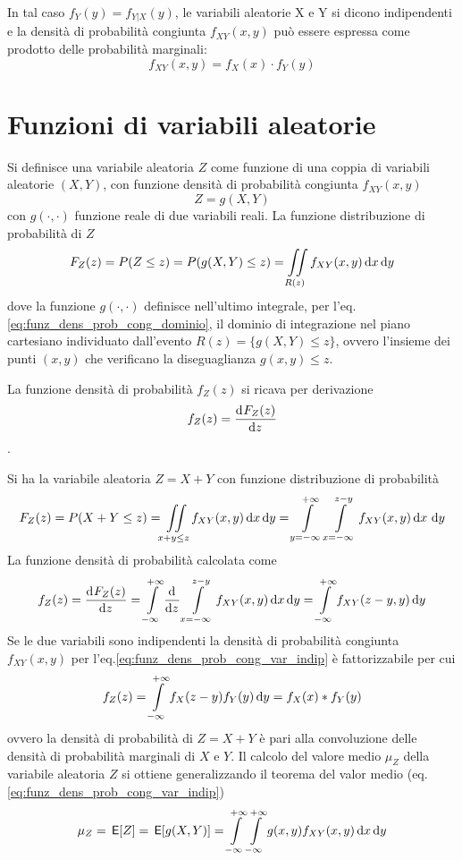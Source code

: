 In tal caso $f_Y(y)=f_{Y|X}(y)$, le variabili aleatorie X e Y si dicono indipendenti e la densità di probabilità congiunta $f_{XY}(x,y)$ può essere espressa come prodotto delle probabilità marginali:
\begin{equation}
\label{eq:funz_dens_prob_cong_var_indip}
	f_{XY}(x,y)=f_X(x)\cdot f_Y(y)
\end{equation}

\clearpage
\section{Funzioni di variabili aleatorie}
Si definisce una variabile aleatoria $Z$ come funzione di una coppia di variabili aleatorie $(X,Y)$, con funzione densità di probabilità congiunta $f_{XY}(x,y)$
\[
	Z=g(X,Y)
\]
con $g(\cdot,\cdot)$ funzione reale di due variabili reali. La funzione distribuzione di probabilità di $Z$
\[
	F_Z(z)=P(Z\leq z)=P(g(X,Y)\leq z)=\iint\limits_{R(z)}{f_{XY}(x,y)\mathop{}\!\mathrm{d} x \mathop{}\!\mathrm{d} y}
\]
dove la funzione $g(\cdot,\cdot)$ definisce nell'ultimo integrale, per l'eq.\ref{eq:funz_dens_prob_cong_dominio}, il dominio di integrazione nel piano cartesiano individuato dall'evento $R(z)=\{g(X,Y)\leq z\}$, ovvero l'insieme dei punti $(x,y)$ che verificano la diseguaglianza $g(x,y)\leq z$.

La funzione densità di probabilità $f_Z(z)$ si ricava per derivazione
\[
	f_Z(z)=\dfrac{\mathop{}\!\mathrm{d}^{}F_Z(z)}{\mathop{}\!\mathrm{d} z^{}}
\].

\begin{esempio}
Si ha la variabile aleatoria $Z=X+Y$ con funzione distribuzione di probabilità
\[
	F_Z(z)=P(X+Y\leq z)=\iint\limits_{x+y\leq z}{f_{XY}(x,y)\mathop{}\!\mathrm{d} x \mathop{}\!\mathrm{d} y}=\int\limits_{y=-\infty}^{+\infty}\int\limits_{x=-\infty}^{z-y}{f_{XY}(x,y)}{\,\mathop{}\!\mathrm{d} x\,\mathop{}\!\mathrm{d} y}
\]
La funzione densità di probabilità calcolata come \[
	f_Z(z)=\dfrac{\mathop{}\!\mathrm{d}^{}F_Z(z)}{\mathop{}\!\mathrm{d} z^{}}=\int\limits_{-\infty}^{+\infty}{\dfrac{\mathop{}\!\mathrm{d}^{}}{\mathop{}\!\mathrm{d} z^{}}\int\limits_{x=-\infty}^{z-y}{f_{XY}(x,y)}{\,\mathop{}\!\mathrm{d}{x}}}{\,\mathop{}\!\mathrm{d}{y}}=\int\limits_{-\infty}^{+\infty}{f_{XY}(z-y,y)}{\,\mathop{}\!\mathrm{d}{y}}
\]
Se le due variabili sono indipendenti la densità di probabilità congiunta $f_{XY}(x,y)$ per l'eq.\ref{eq:funz_dens_prob_cong_var_indip} è fattorizzabile per cui
\[
	f_Z(z)=\int\limits_{-\infty}^{+\infty}{f_X(z-y)f_Y(y)}{\,\mathop{}\!\mathrm{d}{y}}=f_X(x)\ast f_Y(y)
\]
ovvero la densità di probabilità di $Z=X+Y$ è pari alla convoluzione delle densità di probabilità marginali di $X$ e $Y$.
Il calcolo del valore medio $\mu_Z$ della variabile aleatoria $Z$ si ottiene generalizzando il teorema del valor medio (eq.\ref{eq:funz_dens_prob_cong_var_indip})
\[
	\mu_Z=\,{\operatorname{\mathsf{E}}}\!\left[{Z}\right]=\,{\operatorname{\mathsf{E}}}\!\left[{g(X,Y)}\right]=\int\limits_{-\infty}^{+\infty}{\int\limits_{-\infty}^{+\infty}{g(x,y)f_{XY}(x,y)}{\,\mathop{}\!\mathrm{d}{x}}}{\,\mathop{}\!\mathrm{d}{y}}
\]
\end{esempio}


